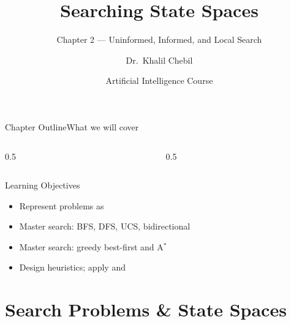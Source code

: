 \documentclass[aspectratio=169,11pt]{beamer}
\title[Ch.\,2 — Search]{Searching State Spaces}
\subtitle{Chapter 2 — Uninformed, Informed, and Local Search}
\author{Dr.\ Khalil Chebil}
\date{Artificial Intelligence Course}
\begin{document}
{
\begin{frame}
  \titlepage
\end{frame}}

\begin{frame}{Chapter Outline}{What we will cover}
  \begin{columns}[T]
    \begin{column}{0.5\textwidth}
      \tableofcontents[sections={1-3}]
    \end{column}
    \begin{column}{0.5\textwidth}
      \tableofcontents[sections={4-5}]
    \end{column}
  \end{columns}
  \vfill
  \begin{block}{Learning Objectives}
    \begin{itemize}
      \item Represent problems as 
      \item Master  search: BFS, DFS, UCS, bidirectional
      \item Master  search: greedy best-first and A$^\ast$
      \item Design  heuristics; apply  and 
    \end{itemize}
  \end{block}
\end{frame}

\section{Search Problems \& State Spaces}
\end{document}

